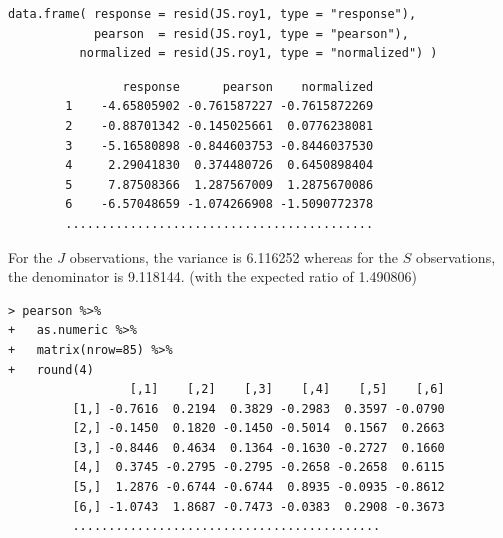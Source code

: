 \documentclass[Main.tex]{subfiles}
\begin{document}
\begin{framed}
\begin{verbatim}
data.frame( response = resid(JS.roy1, type = "response"), 
            pearson  = resid(JS.roy1, type = "pearson"), 
          normalized = resid(JS.roy1, type = "normalized") )
\end{verbatim}
\end{framed}

\begin{verbatim}
                response      pearson    normalized
        1    -4.65805902 -0.761587227 -0.7615872269
        2    -0.88701342 -0.145025661  0.0776238081
        3    -5.16580898 -0.844603753 -0.8446037530
        4     2.29041830  0.374480726  0.6450898404
        5     7.87508366  1.287567009  1.2875670086
        6    -6.57048659 -1.074266908 -1.5090772378
        ...........................................
\end{verbatim}
For the $J$ observations, the variance is 6.116252 whereas for the $S$ observations, the denominator is 9.118144. (with the expected ratio of  1.490806)


\begin{framed}
\begin{verbatim}
> pearson %>%
+   as.numeric %>% 
+   matrix(nrow=85) %>%
+   round(4) 
                 [,1]    [,2]    [,3]    [,4]    [,5]    [,6]
         [1,] -0.7616  0.2194  0.3829 -0.2983  0.3597 -0.0790
         [2,] -0.1450  0.1820 -0.1450 -0.5014  0.1567  0.2663
         [3,] -0.8446  0.4634  0.1364 -0.1630 -0.2727  0.1660
         [4,]  0.3745 -0.2795 -0.2795 -0.2658 -0.2658  0.6115
         [5,]  1.2876 -0.6744 -0.6744  0.8935 -0.0935 -0.8612
         [6,] -1.0743  1.8687 -0.7473 -0.0383  0.2908 -0.3673
         ...........................................
         
\end{verbatim}
\end{framed}
\end{document}
